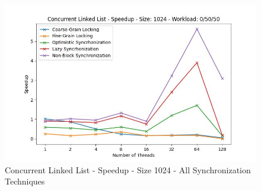 \documentclass[../final_report.tex]{subfiles}
\begin{document}
\begin{figure}[H]
        \includegraphics[scale=0.4]{outFiles/plots/concurrent_data_structs_all_speedup_1024_0_50_50.jpg}
    \caption{Concurrent Linked List - Speedup - Size 1024 - All Synchronization Techniques}
    \label{fig:Concurrent Linked List - Speedup - Size 1024 - All Synchronization Techniques}
\end{figure}
\end{document}
